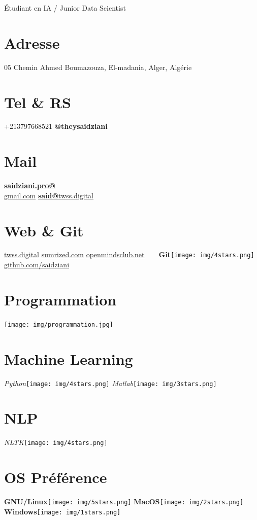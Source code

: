\documentclass[]{friggeri-cv}
\begin{document}
      {Étudiant en IA / Junior Data Scientist}
      

\begin{aside}
  \section{Adresse}
    05 Chemin Ahmed Boumazouza,
    El-madania, Alger, Algérie
    ~
    ~
  \section{Tel \& RS}
    +213797668521
    {\textbf{@theysaidziani}}
    ~
    ~
  \section{Mail}
    \href{mailto:saidziani.pro@gmail.com}{\textbf{saidziani.pro@}\\gmail.com}
    \href{mailto:said@twss.digital}{\textbf{said@}twss.digital}
    ~
    ~
  \section{Web \& Git}
    \href{http://www.twss.digital}{twss.digital}
    \href{http://www.sumrized.com}{sumrized.com}
    \href{http://www.openmindsclub.net}{openmindsclub.net}
    ~
    ~
    \textbf{Git}\texttt{[image: img/4stars.png]}
    \href{https://github.com/saidziani}{github.com/saidziani}
    ~
    ~
  \section{Programmation}
    \texttt{[image: img/programmation.jpg]}
    ~
    ~
  \section{Machine Learning}
    \emph{Python}\texttt{[image: img/4stars.png]}
    \emph{Matlab}\texttt{[image: img/3stars.png]}
    ~
  \section{NLP}
    \emph{NLTK}\texttt{[image: img/4stars.png]}    
    ~
    ~
  \section{OS Préférence}
    \textbf{GNU/Linux}\texttt{[image: img/5stars.png]}
    \textbf{MacOS}\texttt{[image: img/2stars.png]}
    \textbf{Windows}\texttt{[image: img/1stars.png]}
\end{aside}
\vspace{0.42cm}
\end{document}
